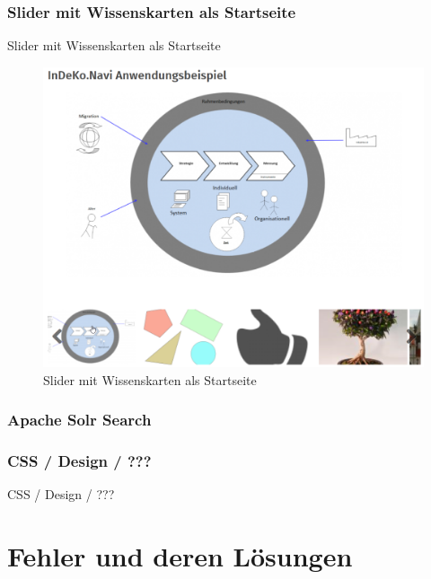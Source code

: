 \subsubsection{Slider mit Wissenskarten als Startseite}\label{subsub:wkslider}
Slider mit Wissenskarten als Startseite
\begin{figure}[H]
	\centering
	\includegraphics[height=0.20\textheight]{images/example_slider}
	\caption{Slider mit Wissenskarten als Startseite}
	\label{fig:example_slider}
\end{figure}


\subsubsection{Apache Solr Search}\label{subsub:apachesolr}



\subsubsection{CSS / Design / ???}\label{subsub:cssdesign}
CSS / Design / ???




\newpage
\section{Fehler und deren Lösungen}\label{sec:problems}

